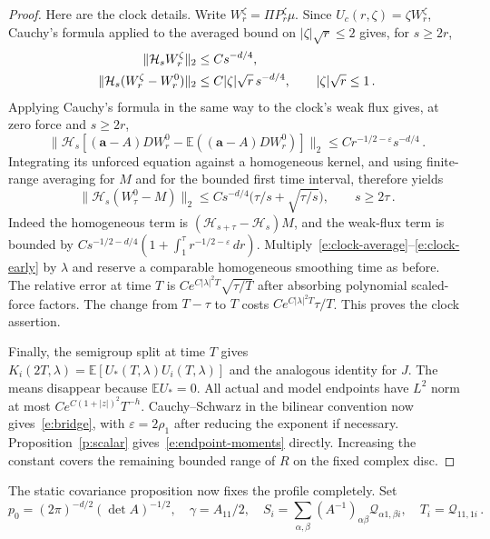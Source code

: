 \documentclass[11pt]{amsart}
\theoremstyle{definition}
\theoremstyle{remark}
\numberwithin{equation}{section}
\newcommand{\E}{\mathbb E}
\renewcommand{\a}{\mathbf a}
\renewcommand{\epsilon}{\varepsilon}
\begin{document}
\begin{proof}
Here are the clock details. Write $W_r^\zeta=\Pi P_r^\zeta\mu$. Since $U_c(r,\zeta)=\zeta W_r^\zeta$, Cauchy's formula applied to the averaged bound on $|\zeta|\sqrt r\leq2$ gives, for $s\geq2r$,
\begin{align}\label{e:clock-average}
 \|\mathcal H_s W_r^\zeta\|_2&\leq Cs^{-d/4},\notag\\
 \|\mathcal H_s(W_r^\zeta-W_r^0)\|_2
     &\leq C|\zeta|\sqrt r\,s^{-d/4},
       \qquad |\zeta|\sqrt r\leq1\, .
\end{align}
Applying Cauchy's formula in the same way to the clock's weak flux gives, at zero force and $s\geq2r$,
\begin{equation*}
 \|\mathcal H_s[(\a-A)DW_r^0-\E((\a-A)DW_r^0)]\|_2
 \leq Cr^{-1/2-\varepsilon}s^{-d/4}\, .
\end{equation*}
Integrating its unforced equation against a homogeneous kernel, and using finite-range averaging for $M$ and for the bounded first time interval, therefore yields
\begin{equation}\label{e:clock-early}
 \|\mathcal H_s(W_\tau^0-M)\|_2
 \leq Cs^{-d/4}\bigl(\tau/s+\sqrt{\tau/s}\bigr),\qquad s\geq2\tau\, .
\end{equation}
Indeed the homogeneous term is $(\mathcal H_{s+\tau}-\mathcal H_s)M$, and the weak-flux term is bounded by $Cs^{-1/2-d/4}(1+\int_1^\tau r^{-1/2-\varepsilon}\,dr)$. Multiply~\eqref{e:clock-average}--\eqref{e:clock-early} by $\lambda$ and reserve a comparable homogeneous smoothing time as before. The relative error at time $T$ is $Ce^{C|\lambda|^2T}\sqrt{\tau/T}$ after absorbing polynomial scaled-force factors. The change from $T-\tau$ to $T$ costs $Ce^{C|\lambda|^2T}\tau/T$. This proves the clock assertion.

Finally, the semigroup split at time $T$ gives $K_i(2T,\lambda)=\E[U_*(T,\lambda)U_i(T,\lambda)]$ and the analogous identity for $J$. The means disappear because $\E U_*=0$. All actual and model endpoints have $L^2$ norm at most $Ce^{C(1+|z|)^2}T^{-h}$. Cauchy--Schwarz in the bilinear convention now gives~\eqref{e:bridge}, with $\epsilon=2\rho_1$ after reducing the exponent if necessary. Proposition~\ref{p:scalar} gives~\eqref{e:endpoint-moments} directly. Increasing the constant covers the remaining bounded range of $R$ on the fixed complex disc.
\end{proof}




The static covariance proposition now fixes the profile completely. Set
\begin{equation}\label{e:profile-data}
 p_0=(2\pi)^{-d/2}(\det A)^{-1/2},\quad
 \gamma=A_{11}/2,\quad
 S_i=\sum_{\alpha,\beta}(A^{-1})_{\alpha\beta}
                   \mathscr Q_{\alpha1,\beta i},\quad
 T_i=\mathscr Q_{11,1i}\, .
\end{equation}
\end{document}
